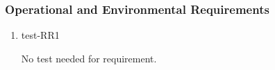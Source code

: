 \documentclass[12pt, titlepage]{article}
\begin{document}

\subsubsection{Operational and Environmental Requirements}

\begin{enumerate}







  \item{test-RR1\\}

  No test needed for requirement.

\end{enumerate}






\end{document}
